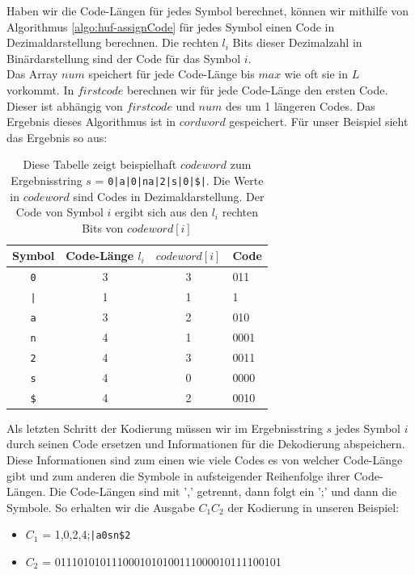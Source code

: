 \documentclass[a4paper,11pt]{scrartcl}%
\theoremstyle{change}
\theoremstyle{nonumberplain}
\theoremstyle{change}
\theoremstyle{nonumberplain}
\theoremstyle{change}
\theoremstyle{nonumberplain}
\begin{document}
Haben wir die Code-Längen für jedes Symbol berechnet, können wir mithilfe von Algorithmus \ref{algo:huf-assignCode} für jedes Symbol einen Code in Dezimaldarstellung berechnen. Die rechten $l_i$ Bits dieser Dezimalzahl in Binärdarstellung sind der Code für das Symbol $i$.\\
Das Array $num$ speichert für jede Code-Länge bis $max$ wie oft sie in $L$ vorkommt. In $firstcode$ berechnen wir für jede Code-Länge den ersten Code. Dieser ist abhängig von $firstcode$ und $num$ des um 1 längeren Codes. Das Ergebnis dieses Algorithmus ist in $cordword$ gespeichert. Für unser Beispiel sieht das Ergebnis so aus:
\newpage
\begin{table}
		\begin{center}
		
		\begin{tabular}[h]{|c|c|c|l|}\hline
			Symbol & Code-Länge $l_i$  & $codeword[i]$ & Code\\ \hline
 		 	\texttt{0} & 3 & 3 & 011		\\ \hline
 			\texttt{|} & 1 & 1 & 1		\\ \hline
			\texttt{a} & 3 & 2 & 010		\\ \hline
 			\texttt{n} & 4 & 1 & 0001	\\ \hline
 			\texttt{2} & 4 & 3 & 0011	\\ \hline
  			\texttt{s} & 4 & 0 & 0000	\\ \hline
  			\texttt{\$} & 4 & 2 & 0010	\\ \hline
		\end{tabular} 
		\end{center}
		\caption{Diese Tabelle zeigt beispielhaft $codeword$ zum Ergebnisstring $s$ = \texttt{0|a|0|na|2|s|0|\$|}. Die Werte in $codeword$ sind Codes in Dezimaldarstellung. Der Code von Symbol $i$ ergibt sich aus den $l_i$ rechten Bits von $codeword[i]$ }
\end{table}


Als letzten Schritt der Kodierung müssen wir im Ergebnisstring $s$ jedes Symbol $i$ durch seinen Code ersetzen und Informationen für die Dekodierung abspeichern. Diese Informationen sind zum einen wie viele Codes es von welcher Code-Länge gibt und zum anderen die Symbole in aufsteigender Reihenfolge ihrer Code-Längen. Die Code-Längen sind mit ',' getrennt, dann folgt ein ';' und dann die Symbole. So erhalten wir die Ausgabe $C_1C_2$ der Kodierung in unseren Beispiel:
\begin{itemize}
	\item $C_1$ = 1,0,2,4;\texttt{|a0sn\$2}
	\item $C_2$ = 0111010101110001010100111000010111100101
\end{itemize}
\end{document}
